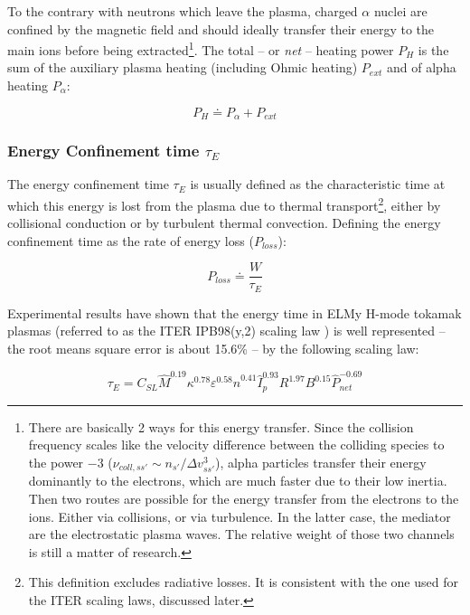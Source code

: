 To the contrary with neutrons which leave the plasma, charged $\alpha$ nuclei are confined by the magnetic field and should ideally transfer their energy to the main ions before being extracted\footnote{There are basically 2 ways for this energy transfer. Since the collision frequency scales like the velocity difference between the colliding species to the power $-3$ ($\nu_{coll,ss'}\sim n_{s'}/\Delta v_{ss'}^3$), alpha particles transfer their energy dominantly to the electrons, which are much faster due to their low inertia. Then two routes are possible for the energy transfer from the electrons to the ions. Either via collisions, or via turbulence. In the latter case, the mediator are the electrostatic plasma waves. The relative weight of those two channels is still a matter of research.}. The total -- or \emph{net} -- heating power $P_H$ is the sum of the auxiliary plasma heating (including Ohmic heating) $P_{ext}$ and of alpha heating $P_\alpha$:

\begin{equation}
P_{H} \doteq P_\alpha + P_{ext}
\label{eq:definition_net_power}
\end{equation}


\subsubsection{Energy Confinement time $\tau_E$}

The energy confinement time $\tau_E$ is usually defined as the characteristic time at which this energy is lost from the plasma due to thermal transport\footnote{This definition excludes radiative losses. It is consistent with the one used for the ITER scaling laws, discussed later.}, either by collisional conduction or by turbulent thermal convection. Defining the energy confinement time as the rate of energy loss ($P_{loss}$)\cite[p.9]{Wesson2004}:

\begin{equation}
	P_{loss} \doteq \frac{ W }{ \tau_E } 
	\label{eq:definition_confinement_time}
\end{equation}

Experimental results have shown that the energy time in ELMy H-mode tokamak plasmas (referred to as the ITER IPB98(y,2) scaling law \cite[eq.(20)]{ITERphysics_chap2}) is well represented -- the root means square error is about 15.6\% -- by the following scaling law:

\begin{equation}
	\tau_E = C_{SL} \hat M^{0.19} \kappa^{0.78} \varepsilon^{0.58} 
	\hat n^{0.41} \hat I_p^{0.93} R^{1.97} B^{0.15}  \hat P_{net}^{-0.69}
	\label{eq:scaling_law_IPB98(y,2)}
\end{equation}


